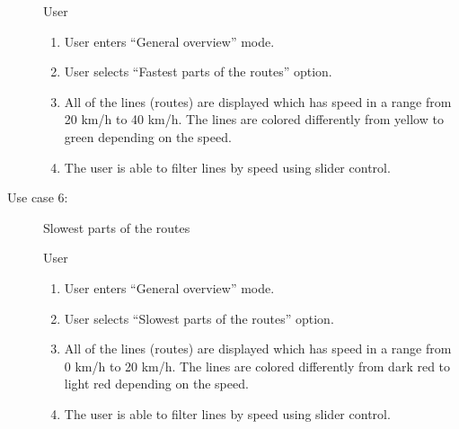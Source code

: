 \begin{description}
  \underline{} User

  \underline{}
  \begin{enumerate}
    \item User enters ``General overview'' mode.
    \item User selects ``Fastest parts of the routes'' option.
    \item All of the lines (routes) are displayed which has speed in a range from
    20 km/h to 40 km/h. The lines are colored differently from yellow to green
    depending on the speed.
    \item The user is able to filter lines by speed using slider control.
  \end{enumerate}

  \item[Use case 6:] Slowest parts of the routes

  \underline{} User

  \underline{}
  \begin{enumerate}
    \item User enters ``General overview'' mode.
    \item User selects ``Slowest parts of the routes'' option.
    \item All of the lines (routes) are displayed which has speed in a range from
    0 km/h to 20 km/h. The lines are colored differently from dark red to light red
    depending on the speed.
    \item The user is able to filter lines by speed using slider control.
  \end{enumerate}
\end{description}